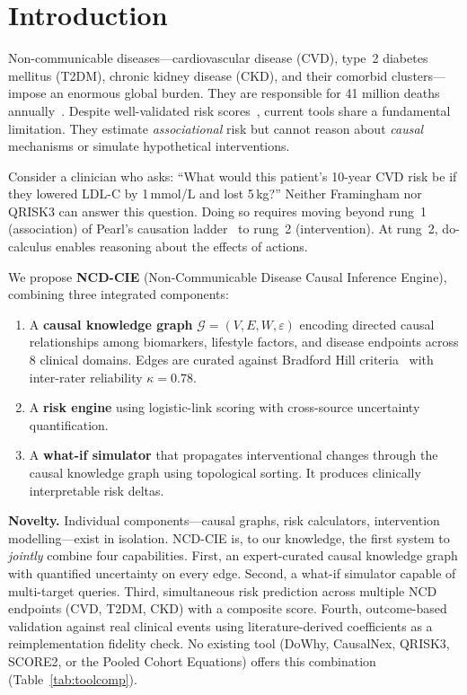 \documentclass[runningheads]{llncs}
\begin{document}
\section{Introduction}\label{sec:intro}

Non-communicable diseases---cardiovascular disease (CVD), type~2
diabetes mellitus (T2DM), chronic kidney disease (CKD), and their
comorbid clusters---impose an enormous global burden.
They are responsible for 41 million deaths
annually~\cite{who2021ncd}.
Despite well-validated risk scores~\cite{dagostino2008,hippisley2017qrisk3,score22021},
current tools share a fundamental limitation.
They estimate \emph{associational} risk but cannot reason about
\emph{causal} mechanisms or simulate hypothetical interventions.

Consider a clinician who asks: ``What would this patient's 10-year
CVD risk be if they lowered LDL-C by 1\,mmol/L and lost 5\,kg?''
Neither Framingham nor QRISK3 can answer this question.
Doing so requires moving beyond rung~1 (association) of Pearl's
causation ladder~\cite{pearl2018book} to rung~2 (intervention).
At rung~2, do-calculus enables reasoning about the effects of actions.

We propose \textbf{NCD-CIE} (Non-Communicable Disease Causal Inference
Engine), combining three integrated components:
\begin{enumerate}
\item A \textbf{causal knowledge graph} $\mathcal{G}=(V,E,W,\varepsilon)$
  encoding directed causal relationships among biomarkers, lifestyle
  factors, and disease endpoints across 8 clinical domains.
  Edges are curated against Bradford Hill
  criteria~\cite{hill1965environment} with inter-rater reliability
  $\kappa=0.78$.
\item A \textbf{risk engine} using logistic-link scoring with
  cross-source uncertainty quantification.
\item A \textbf{what-if simulator} that propagates
  interventional changes through the causal knowledge graph using
  topological sorting.
  It produces clinically interpretable risk deltas.
\end{enumerate}

\noindent\textbf{Novelty.}
Individual components---causal graphs, risk calculators,
intervention modelling---exist in isolation.
NCD-CIE is, to our knowledge, the first system to \emph{jointly}
combine four capabilities.
First, an expert-curated causal knowledge graph with quantified
uncertainty on every edge.
Second, a what-if simulator capable of multi-target
queries.
Third, simultaneous risk prediction across multiple NCD endpoints
(CVD, T2DM, CKD) with a composite score.
Fourth, outcome-based validation against real clinical events using
literature-derived coefficients as a reimplementation fidelity check.
No existing tool (DoWhy, CausalNex, QRISK3, SCORE2, or the Pooled
Cohort Equations) offers this combination (Table~\ref{tab:toolcomp}).
\end{document}
